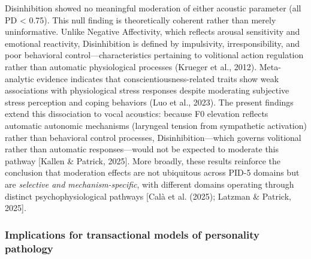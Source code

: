 \documentclass[
  english,
  man]{apa6}
\begin{document}
Disinhibition showed no meaningful moderation of either acoustic parameter (all PD \textless{} 0.75). This null finding is theoretically coherent rather than merely uninformative. Unlike Negative Affectivity, which reflects arousal sensitivity and emotional reactivity, Disinhibition is defined by impulsivity, irresponsibility, and poor behavioral control---characteristics pertaining to volitional action regulation rather than automatic physiological processes (Krueger et al., 2012). Meta-analytic evidence indicates that conscientiousness-related traits show weak associations with physiological stress responses despite moderating subjective stress perception and coping behaviors (Luo et al., 2023). The present findings extend this dissociation to vocal acoustics: because F0 elevation reflects automatic autonomic mechanisms (laryngeal tension from sympathetic activation) rather than behavioral control processes, Disinhibition---which governs volitional rather than automatic responses---would not be expected to moderate this pathway {[}Kallen \& Patrick, 2025{]}. More broadly, these results reinforce the conclusion that moderation effects are not ubiquitous across PID-5 domains but are \emph{selective and mechanism-specific}, with different domains operating through distinct psychophysiological pathways {[}Calà et al. (2025); Latzman \& Patrick, 2025{]}.

\subsubsection{Implications for transactional models of personality pathology}\label{implications-for-transactional-models-of-personality-pathology}
\end{document}
